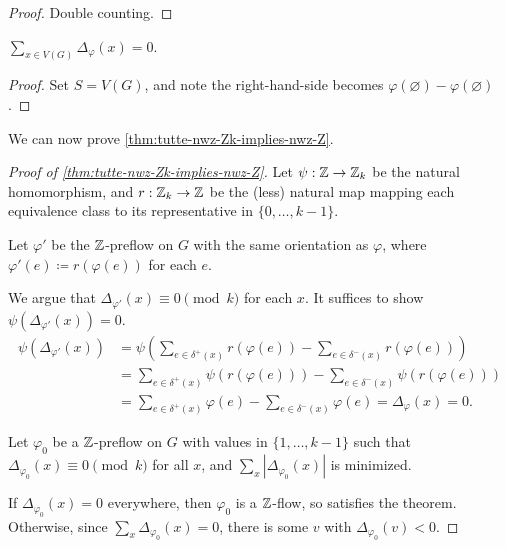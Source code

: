 \documentclass[main.tex]{subfiles}
\begin{document}
\begin{proof}
  Double counting.
\end{proof}
\begin{corollary}
  $\sum_{x\in V(G)}\Delta_\varphi(x) = 0$.
\end{corollary}
\begin{proof}
  Set $S = V(G)$, and note the right-hand-side becomes
  $\varphi(\varnothing) - \varphi(\varnothing)$.
\end{proof}
We can now prove \th\ref{thm:tutte-nwz-Zk-implies-nwz-Z}.
\begin{proof}[Proof of \th\ref{thm:tutte-nwz-Zk-implies-nwz-Z}]
  Let $\psi:\mathbb Z\to\mathbb Z_k$ be the natural homomorphism, and $r:\mathbb Z_k\to\mathbb Z$ be
  the (less) natural map mapping each equivalence class to its representative
  in $\{0,\ldots,k-1\}$.

  Let $\varphi'$ be the $\mathbb Z$-preflow on $G$ with the same orientation as
  $\varphi$, where $\varphi'(e)\coloneqq r(\varphi(e))$ for each $e$.

  We argue that $\Delta_{\varphi'}(x)\equiv 0\pmod k$ for each $x$.
  It suffices to show $\psi(\Delta_{\varphi'}(x)) = 0$.
  \begin{align*}
    \psi(\Delta_{\varphi'}(x))
    &= \psi\left(\sum_{e\in\delta^+(x)}r(\varphi(e)) - \sum_{e\in\delta^-(x)}r(\varphi(e))\right) \\
    &= \sum_{e\in\delta^+(x)}\psi(r(\varphi(e))) - \sum_{e\in\delta^-(x)}\psi(r(\varphi(e))) \\
    &= \sum_{e\in\delta^+(x)}\varphi(e) - \sum_{e\in\delta^-(x)}\varphi(e)
    = \Delta_\varphi(x) = 0.
  \end{align*}

  Let $\varphi_0$ be a $\mathbb Z$-preflow on $G$ with values in $\{1,\ldots,k-1\}$
  such that $\Delta_{\varphi_0}(x)\equiv 0\pmod k$ for all $x$,
  and $\sum_x|\Delta_{\varphi_0}(x)|$ is minimized.

  If $\Delta_{\varphi_0}(x) = 0$ everywhere, then $\varphi_0$ is a $\mathbb Z$-flow,
  so satisfies the theorem.
  Otherwise, since $\sum_x\Delta_{\varphi_0}(x) = 0$, there is some $v$ with
  $\Delta_{\varphi_0}(v) < 0$.


\end{proof}
\end{document}
